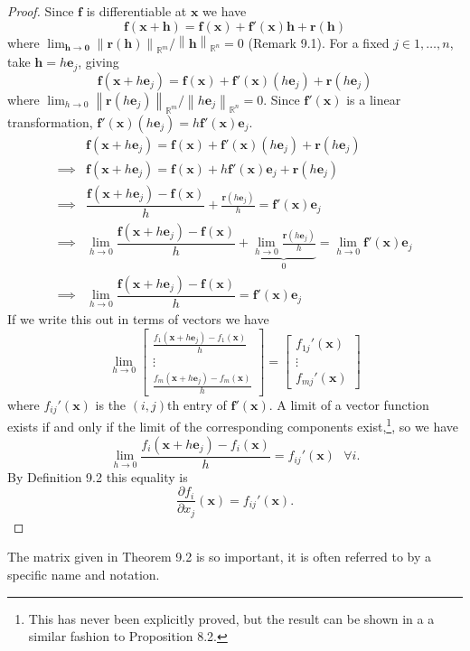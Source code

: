\documentclass{article}
\newcommand{\R}{\mathbb{R}}
\newcommand{\x}{\mathbf{x}}
\newcommand{\f}{\mathbf{f}}
\newcommand{\h}{\mathbf{h}}
\newcommand{\ze}{\mathbf{0}}
\newcommand{\norm}[1]{\left\lVert#1\right\rVert}
\theoremstyle{definition}
\begin{document}
	\begin{proof}
		Since $\f  $ is differentiable at $ \x $ we have $$ \f(\x+\h) = \f(\x) + \f'(\x)\h + \mathbf r(\h) $$  where $ \lim_{\h\to\ze} \norm{\mathbf r(\h)}_{\R^m}/\norm{\h}_{\R^n}=0 $ (Remark 9.1). For a fixed $ j \in {1,\ldots, n} $, take $ \h = h\mathbf e_j $, giving $$ \f(\x+h\mathbf e_j) = \f(\x) + \f'(\x)(h\mathbf e_j) + \mathbf r(h\mathbf e_j) $$  where $ \lim_{h\to0} \norm{\mathbf r(h\mathbf e_j)}_{\R^m}/\norm{h\mathbf e_j}_{\R^n}=0 $. Since $ \f'(\x) $ is a linear transformation, $ \f'(\x)(h\mathbf e_j) = h \f'(\x)\mathbf e_j $.
		\begin{align*}
			&\f(\x+h\mathbf e_j) = \f(\x) + \f'(\x)(h\mathbf e_j) + \mathbf r(h\mathbf e_j)\\
			\implies  & \f(\x+h\mathbf e_j) = \f(\x) + h\f'(\x)\mathbf e_j+ \mathbf r(h\mathbf e_j)\\
			\implies &\dfrac{ \f(\x+h\mathbf e_j) - \f(\x)}{h} +  \frac{\mathbf r(h\mathbf e_j)}{h}= \f'(\x)\mathbf e_j\\
			\implies & \lim_{h\to0}\dfrac{ \f(\x+h\mathbf e_j) - \f(\x)}{h} +  \underbrace{ \lim_{h\to0}\frac{\mathbf r(h\mathbf e_j)}{h}}_0=  \lim_{h\to0}\f'(\x)\mathbf e_j\\\implies & \lim_{h\to0}\dfrac{ \f(\x+h\mathbf e_j) - \f(\x)}{h} =  \f'(\x)\mathbf e_j
		\end{align*}
		If we write this out in terms of vectors we have 
		$$ \lim_{h\to0}\begin{bmatrix}
			\frac{f_1(\x+h\mathbf e_j) - f_1(\x)}{h}\\ \vdots \\ 
			\frac{f_m(\x+h\mathbf e_j) - f_m(\x)}{h}
		\end{bmatrix} =  \begin{bmatrix}
			f_{1j}'(\x)\\ \vdots \\ f_{mj}'(\x)
		\end{bmatrix}$$ where $ f_{ij}'(\x) $ is the $ (i,j) $th entry of $ \f'(\x) $. A limit of a vector function exists if and only if the limit of the corresponding components exist,\footnote{This has never been explicitly proved, but the result can be shown in a a similar fashion to Proposition 8.2.}, so we have 
		$$ 	 \lim_{h\to0}\frac{f_i(\x+h\mathbf e_j) - f_i(\x)}{h} = f_{ij}'(\x) \ \ \ \forall i.$$  By Definition 9.2 this equality is 
		$$\frac{\partial f_i}{\partial x_j}(\x) = f_{ij}'(\x).$$ 
	\end{proof}
	The matrix given in Theorem 9.2 is so important, it is often referred to by a specific name and notation.
\end{document}
